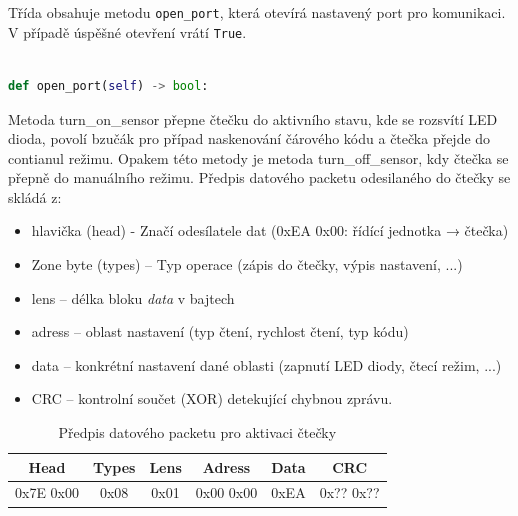 %
\bigskip
Třída obsahuje metodu \texttt{open\_port}, která otevírá nastavený port pro komunikaci. 
V případě úspěšné otevření vrátí \texttt{True}. 

\begin{lstlisting}[language=Python,breaklines=false, frame=single]

def open_port(self) -> bool:
\end{lstlisting}

\bigskip
Metoda turn\_on\_sensor přepne čtečku do aktivního stavu, kde se rozsvítí LED dioda, povolí bzučák pro případ naskenování čárového kódu a čtečka přejde do contianul režimu. Opakem této metody je metoda turn\_off\_sensor, kdy čtečka se přepně do manuálního režimu. Předpis datového packetu odesilaného do čtečky se skládá z:

\begin{itemize}
    \item hlavička (head) - Značí odesílatele dat (0xEA 0x00: řídící jednotka → čtečka)
    \item Zone byte (types) – Typ operace (zápis do čtečky, výpis nastavení, ...)
    \item lens – délka bloku \textit{data} v bajtech
    \item adress – oblast nastavení (typ čtení, rychlost čtení, typ kódu)
    \item data – konkrétní nastavení dané oblasti (zapnutí LED diody, čtecí režim, ...)
    \item CRC – kontrolní součet (XOR) detekující chybnou zprávu. 
\end{itemize}

\begin{table}[H]
    \centering
    \begin{tabular}{|c|c|c|c|c|c|}
         \hline
         Head & Types & Lens & Adress & Data & CRC\\ \hline
         0x7E 0x00 & 0x08 & 0x01 & 0x00 0x00 & 0xEA & 0x?? 0x??\\
         \hline
    \end{tabular}
    \caption{Předpis datového packetu pro aktivaci čtečky}
    \label{tab:my_label}
\end{table}

